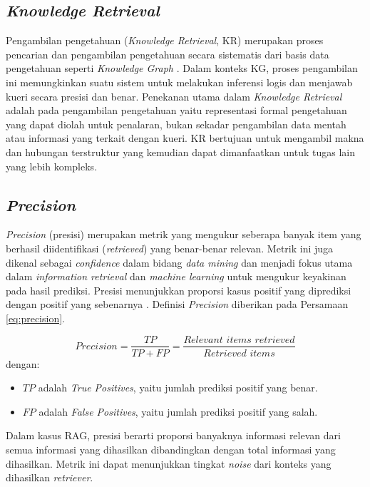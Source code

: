 \subsection{\textit{Knowledge Retrieval}}
Pengambilan pengetahuan (\textit{Knowledge Retrieval}, KR) merupakan proses pencarian dan pengambilan pengetahuan secara sistematis dari basis data pengetahuan seperti \textit{Knowledge Graph} \cite{Yao2007KnowledgeRetrieval}.
Dalam konteks KG, proses pengambilan ini memungkinkan suatu sistem untuk melakukan inferensi logis dan menjawab kueri secara presisi dan benar.
Penekanan utama dalam \textit{Knowledge Retrieval} adalah pada pengambilan pengetahuan yaitu representasi formal pengetahuan yang dapat diolah untuk penalaran, bukan sekadar pengambilan data mentah atau informasi yang terkait dengan kueri.
KR bertujuan untuk mengambil makna dan hubungan terstruktur yang kemudian dapat dimanfaatkan untuk tugas lain yang lebih kompleks.

\subsection{\textit{Precision}}
\textit{Precision} (presisi) merupakan metrik yang mengukur seberapa banyak item yang berhasil diidentifikasi (\textit{retrieved}) yang benar-benar relevan.
Metrik ini juga dikenal sebagai \textit{confidence} dalam bidang \textit{data mining} dan menjadi fokus utama dalam \textit{information retrieval} dan \textit{machine learning} untuk mengukur keyakinan pada hasil prediksi.
Presisi menunjukkan proporsi kasus positif yang diprediksi dengan positif yang sebenarnya \cite{powers2020evaluationprecisionrecallfmeasure}.
Definisi \textit{Precision} diberikan pada Persamaan \ref{eq:precision}.

\begin{equation}
	\label{eq:precision}
	Precision = \frac{TP}{TP + FP}
	= \frac{\textit{Relevant items retrieved}}{\textit{Retrieved items}}
\end{equation}%
dengan:
\begin{itemize}
	\item $TP$ adalah \textit{True Positives}, yaitu jumlah prediksi positif yang benar.
	\item $FP$ adalah \textit{False Positives}, yaitu jumlah prediksi positif yang salah.
\end{itemize}

Dalam kasus RAG, presisi berarti proporsi banyaknya informasi relevan dari semua informasi yang dihasilkan dibandingkan dengan total informasi yang dihasilkan.
Metrik ini dapat menunjukkan tingkat \textit{noise} dari konteks yang dihasilkan \textit{retriever}.

